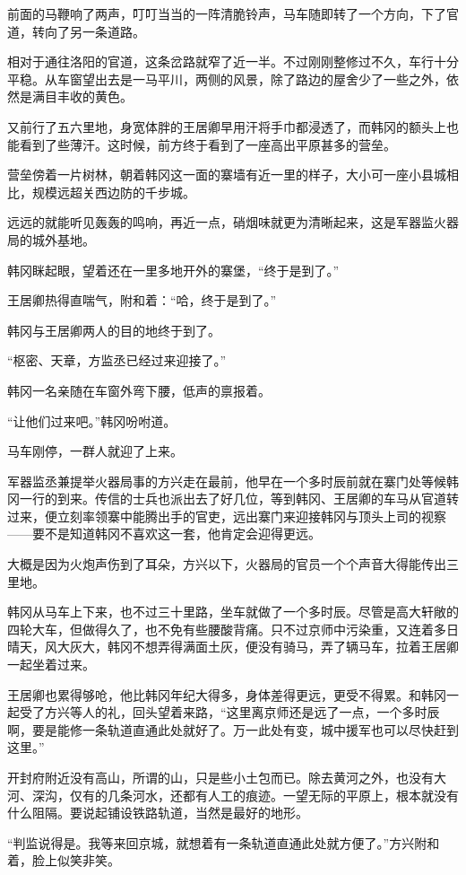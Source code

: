 前面的马鞭响了两声，叮叮当当的一阵清脆铃声，马车随即转了一个方向，下了官道，转向了另一条道路。

相对于通往洛阳的官道，这条岔路就窄了近一半。不过刚刚整修过不久，车行十分平稳。从车窗望出去是一马平川，两侧的风景，除了路边的屋舍少了一些之外，依然是满目丰收的黄色。

又前行了五六里地，身宽体胖的王居卿早用汗将手巾都浸透了，而韩冈的额头上也能看到了些薄汗。这时候，前方终于看到了一座高出平原甚多的营垒。

营垒傍着一片树林，朝着韩冈这一面的寨墙有近一里的样子，大小可一座小县城相比，规模远超关西边防的千步城。

远远的就能听见轰轰的鸣响，再近一点，硝烟味就更为清晰起来，这是军器监火器局的城外基地。

韩冈眯起眼，望着还在一里多地开外的寨堡，“终于是到了。”

王居卿热得直喘气，附和着：“哈，终于是到了。”

韩冈与王居卿两人的目的地终于到了。

“枢密、天章，方监丞已经过来迎接了。”

韩冈一名亲随在车窗外弯下腰，低声的禀报着。

“让他们过来吧。”韩冈吩咐道。

马车刚停，一群人就迎了上来。

军器监丞兼提举火器局事的方兴走在最前，他早在一个多时辰前就在寨门处等候韩冈一行的到来。传信的士兵也派出去了好几位，等到韩冈、王居卿的车马从官道转过来，便立刻率领寨中能腾出手的官吏，远出寨门来迎接韩冈与顶头上司的视察——要不是知道韩冈不喜欢这一套，他肯定会迎得更远。

大概是因为火炮声伤到了耳朵，方兴以下，火器局的官员一个个声音大得能传出三里地。

韩冈从马车上下来，也不过三十里路，坐车就做了一个多时辰。尽管是高大轩敞的四轮大车，但做得久了，也不免有些腰酸背痛。只不过京师中污染重，又连着多日晴天，风大灰大，韩冈不想弄得满面土灰，便没有骑马，弄了辆马车，拉着王居卿一起坐着过来。

王居卿也累得够呛，他比韩冈年纪大得多，身体差得更远，更受不得累。和韩冈一起受了方兴等人的礼，回头望着来路，“这里离京师还是远了一点，一个多时辰啊，要是能修一条轨道直通此处就好了。万一此处有变，城中援军也可以尽快赶到这里。”

开封府附近没有高山，所谓的山，只是些小土包而已。除去黄河之外，也没有大河、深沟，仅有的几条河水，还都有人工的痕迹。一望无际的平原上，根本就没有什么阻隔。要说起铺设铁路轨道，当然是最好的地形。

“判监说得是。我等来回京城，就想着有一条轨道直通此处就方便了。”方兴附和着，脸上似笑非笑。

